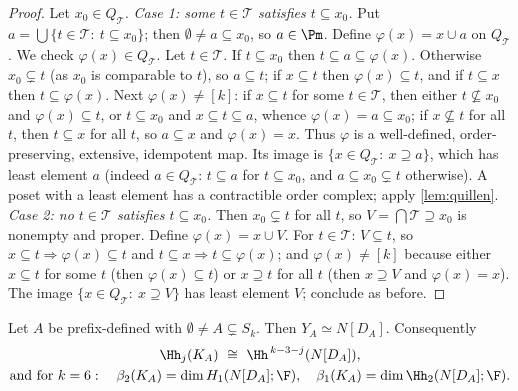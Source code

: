\begin{proof}
Let $x_0\in Q_{\mathcal T}$.
\emph{Case 1: some $t\in\mathcal T$ satisfies $t\subseteq x_0$.} Put $a=\bigcup\{t\in\mathcal T:\ t\subseteq x_0\}$; then $\emptyset\neq a\subseteq x_0$, so $a\in\Pm$. Define $\varphi(x)=x\cup a$ on $Q_{\mathcal T}$. We check $\varphi(x)\in Q_{\mathcal T}$. Let $t\in\mathcal T$. If $t\subseteq x_0$ then $t\subseteq a\subseteq\varphi(x)$. Otherwise $x_0\subsetneq t$ (as $x_0$ is comparable to $t$), so $a\subseteq t$; if $x\subseteq t$ then $\varphi(x)\subseteq t$, and if $t\subseteq x$ then $t\subseteq\varphi(x)$. Next $\varphi(x)\ne[k]$: if $x\subseteq t$ for some $t\in\mathcal T$, then either $t\not\subseteq x_0$ and $\varphi(x)\subseteq t$, or $t\subseteq x_0$ and $x\subseteq t\subseteq a$, whence $\varphi(x)=a\subseteq x_0$; if $x\not\subseteq t$ for all $t$, then $t\subseteq x$ for all $t$, so $a\subseteq x$ and $\varphi(x)=x$. Thus $\varphi$ is a well-defined, order-preserving, extensive, idempotent map. Its image is $\{x\in Q_{\mathcal T}:\ x\supseteq a\}$, which has least element $a$ (indeed $a\in Q_{\mathcal T}$: $t\subseteq a$ for $t\subseteq x_0$, and $a\subseteq x_0\subsetneq t$ otherwise). A poset with a least element has a contractible order complex; apply \cref{lem:quillen}.
\emph{Case 2: no $t\in\mathcal T$ satisfies $t\subseteq x_0$.} Then $x_0\subsetneq t$ for all $t$, so $V=\bigcap\mathcal T\supseteq x_0$ is nonempty and proper. Define $\varphi(x)=x\cup V$. For $t\in\mathcal T$: $V\subseteq t$, so $x\subseteq t\Rightarrow\varphi(x)\subseteq t$ and $t\subseteq x\Rightarrow t\subseteq\varphi(x)$; and $\varphi(x)\ne[k]$ because either $x\subseteq t$ for some $t$ (then $\varphi(x)\subseteq t$) or $x\supseteq t$ for all $t$ (then $x\supseteq V$ and $\varphi(x)=x$). The image $\{x\in Q_{\mathcal T}:\ x\supseteq V\}$ has least element $V$; conclude as before.
\end{proof}
\begin{theorem}\label{thm:nerve}
Let $A$ be prefix-defined with $\emptyset\ne A\subsetneq S_k$. Then $Y_A\simeq N[D_A]$. Consequently
\begin{gather*}
\Hh_j(K_A)\ \cong\ \Hh^{\,k-3-j}(N[D_A]),\\
\text{and for }k=6:\quad \beta_2(K_A)=\dim H_1(N[D_A];\F),\quad \beta_1(K_A)=\dim\Hh_2(N[D_A];\F).
\end{gather*}
\end{theorem}
